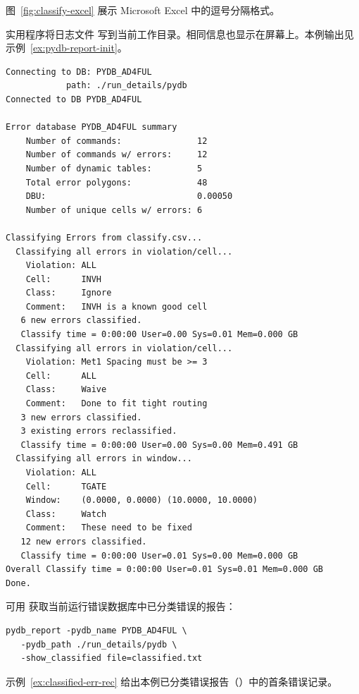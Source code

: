 图~\ref{fig:classify-excel} 展示 Microsoft Excel 中的逗号分隔格式。


 实用程序将日志文件  写到当前工作目录。相同信息也显示在屏幕上。本例输出见示例~\ref{ex:pydb-report-init}。

\begin{lstlisting}[style=shell,caption={初始 pydb\_report 实用程序 pydbreport.log},label={ex:pydb-report-init}]
Connecting to DB: PYDB_AD4FUL
            path: ./run_details/pydb
Connected to DB PYDB_AD4FUL

Error database PYDB_AD4FUL summary
    Number of commands:               12
    Number of commands w/ errors:     12
    Number of dynamic tables:         5
    Total error polygons:             48
    DBU:                              0.00050
    Number of unique cells w/ errors: 6

Classifying Errors from classify.csv...
  Classifying all errors in violation/cell...
    Violation: ALL
    Cell:      INVH
    Class:     Ignore
    Comment:   INVH is a known good cell
   6 new errors classified.
   Classify time = 0:00:00 User=0.00 Sys=0.01 Mem=0.000 GB
  Classifying all errors in violation/cell...
    Violation: Met1 Spacing must be >= 3
    Cell:      ALL
    Class:     Waive
    Comment:   Done to fit tight routing
   3 new errors classified.
   3 existing errors reclassified.
   Classify time = 0:00:00 User=0.00 Sys=0.00 Mem=0.491 GB
  Classifying all errors in window...
    Violation: ALL
    Cell:      TGATE
    Window:    (0.0000, 0.0000) (10.0000, 10.0000)
    Class:     Watch
    Comment:   These need to be fixed
   12 new errors classified.
   Classify time = 0:00:00 User=0.01 Sys=0.00 Mem=0.000 GB
Overall Classify time = 0:00:00 User=0.01 Sys=0.01 Mem=0.000 GB
Done.
\end{lstlisting}

可用  获取当前运行错误数据库中已分类错误的报告：
\begin{lstlisting}[style=shell]
pydb_report -pydb_name PYDB_AD4FUL \
   -pydb_path ./run_details/pydb \
   -show_classified file=classified.txt
\end{lstlisting}

示例~\ref{ex:classified-err-rec} 给出本例已分类错误报告（）中的首条错误记录。

